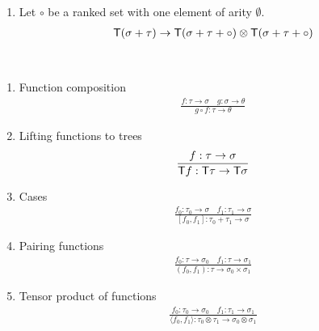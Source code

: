 \begin{definition}
\begin{enumerate}

    
        \item Let $\circ$ be a ranked set with one element of arity $\emptyset$.
    \begin{align*}
        \mathsf T(\sigma+\tau) \to \mathsf T(\sigma+\tau+\circ) \otimes \mathsf T(\sigma+\tau+\circ)
    \end{align*}

\end{enumerate}
\end{definition}



\begin{definition}
    [Combinators] \label{def:combinators} \ 
    \begin{enumerate}
    \item Function composition
    \begin{align*}
    \frac{f : \tau \to \sigma \quad g : \sigma \to \theta} {g \circ f : \tau \to \theta}
\end{align*}

\item Lifting functions to trees
\begin{align*}
    \frac{f : \tau \to \sigma} {\mathsf T f : \mathsf T \tau \to \mathsf T \sigma}
\end{align*}
\item Cases
\begin{align*}
    \frac{f_0 : \tau_0 \to \sigma \quad f_1 : \tau_1 \to \sigma} {[f_0,f_1] : \tau_0 + \tau_1 \to \sigma}
\end{align*}

\item Pairing functions
\begin{align*}
    \frac{f_0 : \tau \to \sigma_0 \quad f_1 : \tau \to \sigma_1} {(f_0,f_1) : \tau \to \sigma_0 \times \sigma_1}
\end{align*}

\item Tensor product of functions
\begin{align*}
    \frac{f_0 : \tau_0 \to \sigma_0 \quad f_1 : \tau_1 \to \sigma_1} {\langle f_0,f_1 \rangle : \tau_0 \otimes \tau_1 \to \sigma_0 \otimes \sigma_1}
\end{align*}
\end{enumerate}
\end{definition}

